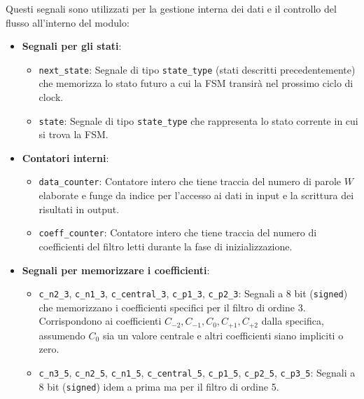 \documentclass{article}
\begin{document}
Questi segnali sono utilizzati per la gestione interna dei dati e il controllo del flusso all'interno del modulo:
\begin{itemize}
    \item \textbf{Segnali per gli stati}:
    \begin{itemize}
        \item \texttt{next\_state}: Segnale di tipo \texttt{state\_type} (stati descritti precedentemente) che memorizza lo stato futuro a cui la FSM transirà nel prossimo ciclo di clock.
        \item \texttt{state}: Segnale di tipo \texttt{state\_type} che rappresenta lo stato corrente in cui si trova la FSM.
    \end{itemize} 
    
    \item \textbf{Contatori interni}: 
    \begin{itemize}
        \item \texttt{data\_counter}: Contatore intero che tiene traccia del numero di parole $W$ elaborate e funge da indice per l'accesso ai dati in input e la scrittura dei risultati in output.
        \item \texttt{coeff\_counter}: Contatore intero che tiene traccia del numero di coefficienti del filtro letti durante la fase di inizializzazione.
    \end{itemize}

    \item \textbf{Segnali per memorizzare i coefficienti}: 
    \begin{itemize}
        \item \texttt{c\_n2\_3}, \texttt{c\_n1\_3}, \texttt{c\_central\_3}, \texttt{c\_p1\_3}, \texttt{c\_p2\_3}: Segnali a 8 bit (\texttt{signed}) che memorizzano i coefficienti specifici per il filtro di ordine 3. Corrispondono ai coefficienti $C_{-2}, C_{-1}, C_0, C_{+1}, C_{+2}$ dalla specifica, assumendo $C_0$ sia un valore centrale e altri coefficienti siano impliciti o zero.
        \item \texttt{c\_n3\_5}, \texttt{c\_n2\_5}, \texttt{c\_n1\_5}, \texttt{c\_central\_5}, \texttt{c\_p1\_5}, \texttt{c\_p2\_5}, \texttt{c\_p3\_5}: Segnali a 8 bit (\texttt{signed}) idem a prima ma per il filtro di ordine 5.
    \end{itemize}


\end{itemize}
\end{document}
